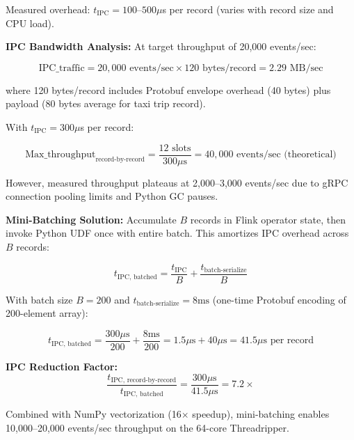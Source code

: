 Measured overhead: $t_{\text{IPC}} = 100$--$500\mu$s per record (varies with record size and CPU load).

\textbf{IPC Bandwidth Analysis:} At target throughput of 20,000 events/sec:

\begin{equation}
\text{IPC\_traffic} = 20{,}000 \text{ events/sec} \times 120 \text{ bytes/record} = 2.29 \text{ MB/sec}
\end{equation}

where 120 bytes/record includes Protobuf envelope overhead (40 bytes) plus payload (80 bytes average for taxi trip record).

With $t_{\text{IPC}} = 300\mu$s per record:

\begin{equation}
\text{Max\_throughput}_{\text{record-by-record}} = \frac{12 \text{ slots}}{300\mu\text{s}} = 40{,}000 \text{ events/sec (theoretical)}
\end{equation}

However, measured throughput plateaus at 2,000--3,000 events/sec due to gRPC connection pooling limits and Python GC pauses.

\textbf{Mini-Batching Solution:} Accumulate $B$ records in Flink operator state, then invoke Python UDF once with entire batch. This amortizes IPC overhead across $B$ records:

\begin{equation}
t_{\text{IPC, batched}} = \frac{t_{\text{IPC}}}{B} + \frac{t_{\text{batch-serialize}}}{B}
\end{equation}

With batch size $B = 200$ and $t_{\text{batch-serialize}} = 8\text{ms}$ (one-time Protobuf encoding of 200-element array):

\begin{equation}
t_{\text{IPC, batched}} = \frac{300\mu\text{s}}{200} + \frac{8\text{ms}}{200} = 1.5\mu\text{s} + 40\mu\text{s} = 41.5\mu\text{s per record}
\end{equation}

\textbf{IPC Reduction Factor:}
\begin{equation}
\frac{t_{\text{IPC, record-by-record}}}{t_{\text{IPC, batched}}} = \frac{300\mu\text{s}}{41.5\mu\text{s}} = 7.2\times
\end{equation}

Combined with NumPy vectorization (16$\times$ speedup), mini-batching enables 10,000--20,000 events/sec throughput on the 64-core Threadripper.

